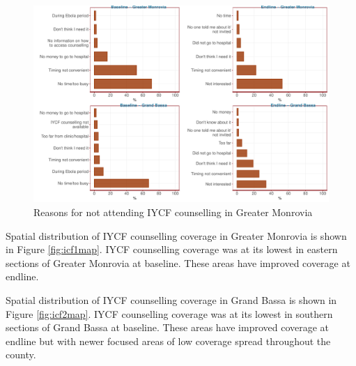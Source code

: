 \documentclass[12pt,a4paper]{article}
\begin{document}
\begin{figure}[H]

{\centering \includegraphics{liberiaCoverageFinalReport_files/figure-latex/icf2table-1} 

}

\caption{Reasons for not attending IYCF counselling in Greater Monrovia}\label{fig:icf2table}
\end{figure}

Spatial distribution of IYCF counselling coverage in Greater Monrovia is shown in Figure \ref{fig:icf1map}. IYCF counselling coverage was at its lowest in eastern sections of Greater Monrovia at baseline. These areas have improved coverage at endline.

Spatial distribution of IYCF counselling coverage in Grand Bassa is shown in Figure \ref{fig:icf2map}. IYCF counselling coverage was at its lowest in southern sections of Grand Bassa at baseline. These areas have improved coverage at endline but with newer focused areas of low coverage spread throughout the county.
\end{document}
